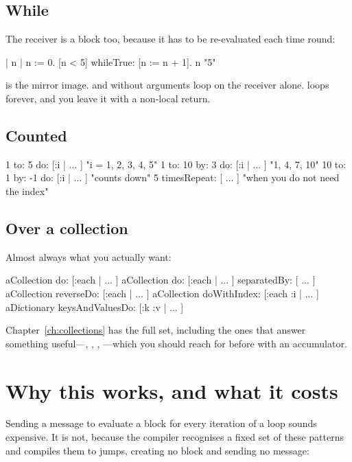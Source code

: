\subsection{While}

The receiver is a block too, because it has to be re-evaluated each time
round:

\begin{st}
| n |
n := 0.
[n < 5] whileTrue: [n := n + 1].
n                                    "5"
\end{st}

 is the mirror image.  and 
without arguments loop on the receiver alone.  loops forever, and
you leave it with a non-local return.

\subsection{Counted}

\begin{st}
1 to: 5 do: [:i | ... ]              "i = 1, 2, 3, 4, 5"
1 to: 10 by: 3 do: [:i | ... ]       "1, 4, 7, 10"
10 to: 1 by: -1 do: [:i | ... ]      "counts down"
5 timesRepeat: [ ... ]               "when you do not need the index"
\end{st}

\subsection{Over a collection}

Almost always what you actually want:

\begin{st}
aCollection do: [:each | ... ]
aCollection do: [:each | ... ] separatedBy: [ ... ]
aCollection reverseDo: [:each | ... ]
aCollection doWithIndex: [:each :i | ... ]
aDictionary keysAndValuesDo: [:k :v | ... ]
\end{st}

Chapter~\ref{ch:collections} has the full set, including the ones that answer
something useful---, , ,
---which you should reach for before  with an
accumulator.

\section{Why this works, and what it costs}

Sending a message to evaluate a block for every iteration of a loop sounds
expensive. It is not, because the compiler recognises a fixed set of these
patterns and compiles them to jumps, creating no block and sending no message:

